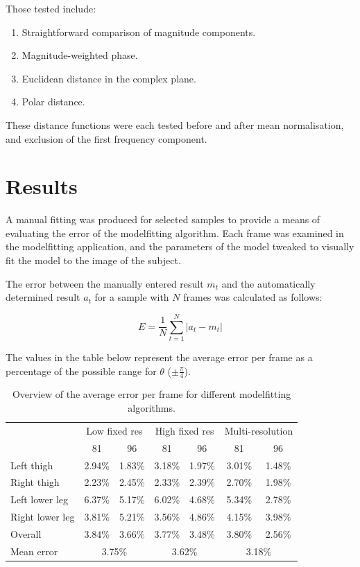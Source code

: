 \documentclass[a4paper,12pt]{article}
\begin{document}
Those tested include:

\begin{enumerate}
	\item Straightforward comparison of magnitude components.
	\item Magnitude-weighted phase.
	\item Euclidean distance in the complex plane.
	\item Polar distance.
\end{enumerate}

These distance functions were each tested before and after mean normalisation, and exclusion of the first frequency component.


\newpage
\section{Results}

A manual fitting was produced for selected samples to provide a means of evaluating the error of the modelfitting algorithm.
Each frame was examined in the modelfitting application, and the parameters of the model tweaked to visually fit the model to the image of the subject.

The error between the manually entered result $m_t$ and the automatically determined result $a_t$ for a sample with $N$ frames was calculated as follows:

\begin{equation}
	E = \frac{1}{N} \sum_{t=1}^N \left| a_t - m_t \right|
\end{equation}

The values in the table below represent the average error per frame as a percentage of the possible range for $\theta$ ($\pm \frac{\pi}{4}$).

\begin{table}[thb]
	\centering
	\begin{tabular}{l|cc|cc|cc}
		& \multicolumn{2}{|c|}{Low fixed res} & \multicolumn{2}{|c|}{High fixed res} & \multicolumn{2}{|c}{Multi-resolution} \\
		& 81 & 96 & 81 & 96 & 81 & 96 \\
		\hline
		Left thigh & 2.94\% & 1.83\% & 3.18\% & 1.97\% & 3.01\% & 1.48\% \\
		Right thigh & 2.23\% & 2.45\% & 2.33\% & 2.39\% & 2.70\% & 1.98\% \\
		Left lower leg & 6.37\% & 5.17\% & 6.02\% & 4.68\% & 5.34\% & 2.78\% \\
		Right lower leg & 3.81\% & 5.21\% & 3.56\% & 4.86\% & 4.15\% & 3.98\% \\
		\hline
		Overall & 3.84\% & 3.66\% & 3.77\% & 3.48\% & 3.80\% & 2.56\% \\
		Mean error & \multicolumn{2}{|c|}{3.75\%} & \multicolumn{2}{|c|}{3.62\%} & \multicolumn{2}{|c}{3.18\%} \\
	\end{tabular}
	\caption{Overview of the average error per frame for different modelfitting algorithms.}
	\label{ManualFitTable}
\end{table}
\end{document}
